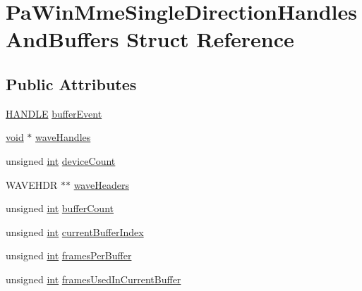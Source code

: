 \hypertarget{struct_pa_win_mme_single_direction_handles_and_buffers}{}\section{Pa\+Win\+Mme\+Single\+Direction\+Handles\+And\+Buffers Struct Reference}
\label{struct_pa_win_mme_single_direction_handles_and_buffers}
\subsection*{Public Attributes}
\begin{DoxyCompactItemize}
\item 
\hyperlink{_sound_touch_d_l_l_8h_aa8c0374618b33785ccb02f74bcfebc46}{H\+A\+N\+D\+LE} \hyperlink{struct_pa_win_mme_single_direction_handles_and_buffers_a148e3c781c816c92dae5e770dc5b9e20}{buffer\+Event}
\item 
\hyperlink{sound_8c_ae35f5844602719cf66324f4de2a658b3}{void} $\ast$ \hyperlink{struct_pa_win_mme_single_direction_handles_and_buffers_a4fe7db0c9d532611932970f65aab44e9}{wave\+Handles}
\item 
unsigned \hyperlink{xmltok_8h_a5a0d4a5641ce434f1d23533f2b2e6653}{int} \hyperlink{struct_pa_win_mme_single_direction_handles_and_buffers_a8bc9a78d4eee86140c8c1b6114cc015a}{device\+Count}
\item 
W\+A\+V\+E\+H\+DR $\ast$$\ast$ \hyperlink{struct_pa_win_mme_single_direction_handles_and_buffers_a8df074ef0acecf9d5561398f4cfcd791}{wave\+Headers}
\item 
unsigned \hyperlink{xmltok_8h_a5a0d4a5641ce434f1d23533f2b2e6653}{int} \hyperlink{struct_pa_win_mme_single_direction_handles_and_buffers_a4384a525154d9ed05a8f4b3898369eb5}{buffer\+Count}
\item 
unsigned \hyperlink{xmltok_8h_a5a0d4a5641ce434f1d23533f2b2e6653}{int} \hyperlink{struct_pa_win_mme_single_direction_handles_and_buffers_a8e111457cd124abc104ad6ccd4345211}{current\+Buffer\+Index}
\item 
unsigned \hyperlink{xmltok_8h_a5a0d4a5641ce434f1d23533f2b2e6653}{int} \hyperlink{struct_pa_win_mme_single_direction_handles_and_buffers_ad031742efc4c45f1f420ca6b2ed33771}{frames\+Per\+Buffer}
\item 
unsigned \hyperlink{xmltok_8h_a5a0d4a5641ce434f1d23533f2b2e6653}{int} \hyperlink{struct_pa_win_mme_single_direction_handles_and_buffers_a67c47bbd9a948174ea0fecbe6a9939fa}{frames\+Used\+In\+Current\+Buffer}
\end{DoxyCompactItemize}


